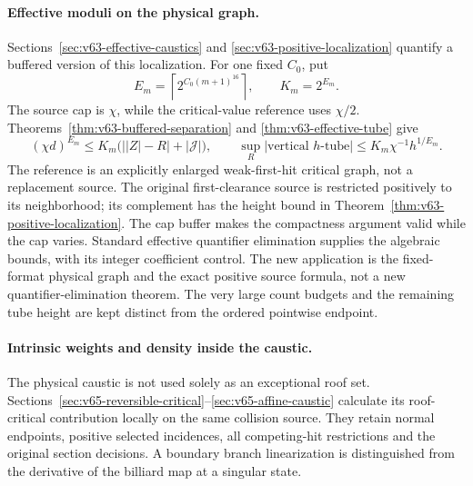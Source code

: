 \paragraph{Effective moduli on the physical graph.}
Sections~\ref{sec:v63-effective-caustics} and
\ref{sec:v63-positive-localization} quantify a buffered version of
this localization. For one fixed $C_0$, put
\[
 E_m=\left\lceil2^{C_0(m+1)^{16}}\right\rceil,\qquad K_m=2^{E_m}.
\]
The source cap is $\chi$, while the critical-value reference uses
$\chi/2$. Theorems~\ref{thm:v63-buffered-separation} and
\ref{thm:v63-effective-tube} give
\[
 (\chi d)^{E_m}\le K_m\bigl(\bigl||Z|-R\bigr|+|\mathcal J|\bigr),
 \qquad \sup_R|\text{vertical }h\text{-tube}|
                  \le K_m\chi^{-1}h^{1/E_m}.
\]
The reference is an explicitly enlarged weak-first-hit critical graph,
not a replacement source. The original first-clearance source is
restricted positively to its neighborhood; its complement has the
height bound in Theorem~\ref{thm:v63-positive-localization}. The cap
buffer makes the compactness argument valid while the cap varies.
Standard effective quantifier elimination supplies the algebraic
bounds, with its integer coefficient control. The new application is
the fixed-format physical graph and the exact positive source formula,
not a new quantifier-elimination theorem. The very large count budgets
and the remaining tube height are kept distinct from the ordered
pointwise endpoint.


\paragraph{Intrinsic weights and density inside the caustic.}
The physical caustic is not used solely as an exceptional roof set.
Sections~\ref{sec:v65-reversible-critical}--\ref{sec:v65-affine-caustic}
calculate its roof-critical contribution locally on the same collision
source. They retain normal endpoints, positive selected incidences,
all competing-hit restrictions and the original section decisions.
A boundary branch linearization is distinguished from the derivative
of the billiard map at a singular state.

